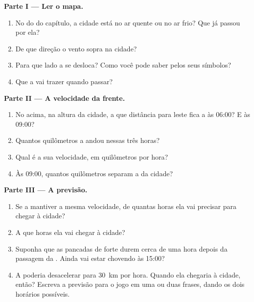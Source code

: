 \begin{problem}
\noindent\textbf{Parte I --- Ler o mapa.}\par\nopagebreak
\begin{enumerate}[beginpenalty=10000]
  \item No  do  do capítulo, a cidade está no ar quente ou no ar
        frio? Que  já passou por ela?
  \item De que direção o vento sopra na cidade?
  \item Para que lado a  se desloca? Como você pode saber
        pelos seus símbolos?
  \item Que  a  vai trazer quando passar?
\end{enumerate}

\noindent\textbf{Parte II --- A velocidade da frente.}\par\nopagebreak
\begin{enumerate}[resume, beginpenalty=10000]
  \item No  acima, na altura da cidade, a que distância para leste
        fica a  às 06:00? E às 09:00?
  \item Quantos quilômetros a  andou nessas três horas?
  \item Qual é a sua velocidade, em quilômetros por hora?
  \item Às 09:00, quantos quilômetros separam a  da cidade?
\end{enumerate}

\noindent\textbf{Parte III --- A previsão.}\par\nopagebreak
\begin{enumerate}[resume, beginpenalty=10000]
  \item Se a  mantiver a mesma velocidade, de quantas horas ela vai
        precisar para chegar à cidade?
  \item A que horas ela vai chegar à cidade?
  \item Suponha que as pancadas de  forte durem cerca de uma hora
        depois da passagem da . Ainda vai estar chovendo às 15:00?
  \item A  poderia desacelerar para \qty{30}{km} por hora. Quando
        ela chegaria à cidade, então? Escreva a previsão para o jogo em
        uma ou duas frases, dando os dois horários possíveis.
\end{enumerate}
\end{problem}
